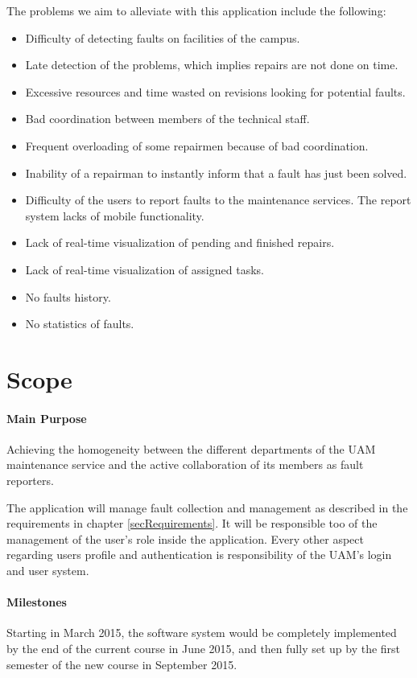 \documentclass{report}
\begin{document}
The problems we aim to alleviate with this application include the following:


\begin{itemize}
\item Difficulty of detecting faults on facilities of the campus.
\item Late detection of the problems, which implies repairs are not done on time.
\item Excessive resources and time wasted on revisions looking for potential faults.
\item Bad coordination between members of the technical staff.
\item Frequent overloading of some repairmen because of bad coordination.
\item Inability of a repairman to instantly inform that a fault has just been solved.
\item Difficulty of the users to report faults to the maintenance services.
The report system lacks of mobile functionality.
\item Lack of real-time visualization of pending and finished repairs.
\item Lack of real-time visualization of assigned tasks.
\item No faults history.
\item No statistics of faults.
\end{itemize}

\section{Scope}

\paragraph{Main Purpose} Achieving the homogeneity between the different departments of the UAM maintenance service and the active collaboration of its members as fault reporters.

The application will manage fault collection and management as described in the requirements in chapter \ref{secRequirements}. It will be responsible too of the management of the user's role inside the application. Every other aspect regarding users profile and authentication is responsibility of the UAM's login and user system.

\paragraph{Milestones} Starting in March 2015, the software system would be completely implemented by the end of the current course in June 2015, and then fully set up by the first semester of the new course in September 2015.
\end{document}
